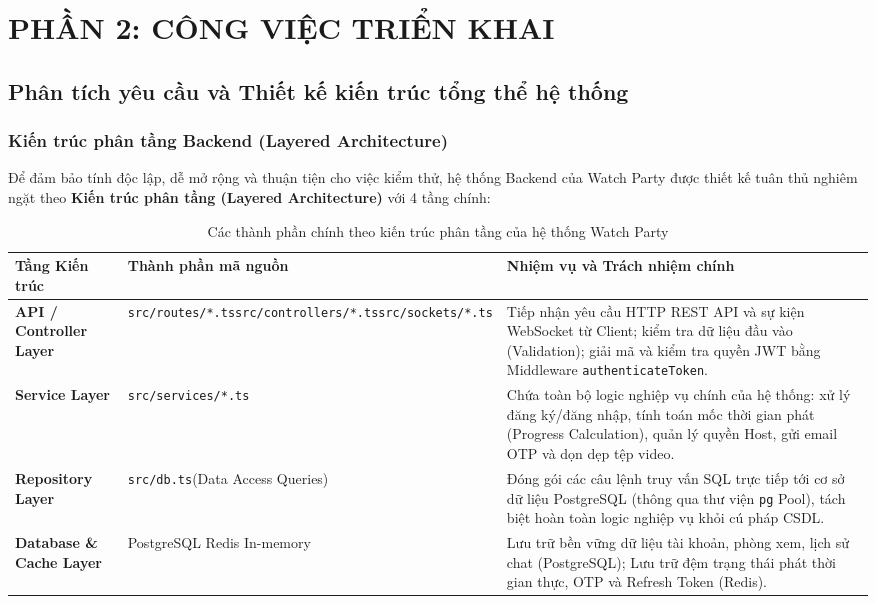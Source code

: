 \documentclass[12pt,a4paper]{extarticle}
\begin{document}
\newpage

\section{PHẦN 2: CÔNG VIỆC TRIỂN KHAI}

\subsection{Phân tích yêu cầu và Thiết kế kiến trúc tổng thể hệ thống}

\subsubsection{Kiến trúc phân tầng Backend (Layered Architecture)}
Để đảm bảo tính độc lập, dễ mở rộng và thuận tiện cho việc kiểm thử, hệ thống Backend của Watch Party được thiết kế tuân thủ nghiêm ngặt theo \textbf{Kiến trúc phân tầng (Layered Architecture)} với 4 tầng chính:

\begin{table}[H]
\centering
\small
\caption{Các thành phần chính theo kiến trúc phân tầng của hệ thống Watch Party}
\label{tab:arch_layers}
\renewcommand{\arraystretch}{1.3}
\begin{tabular}{|p{3cm}|p{4.5cm}|p{7.5cm}|}
\hline
\textbf{Tầng Kiến trúc} & \textbf{Thành phần mã nguồn} & \textbf{Nhiệm vụ và Trách nhiệm chính} \\ \hline
\textbf{API / Controller Layer} & \texttt{src/routes/*.ts}\newline \texttt{src/controllers/*.ts}\newline \texttt{src/sockets/*.ts} & Tiếp nhận yêu cầu HTTP REST API và sự kiện WebSocket từ Client; kiểm tra dữ liệu đầu vào (Validation); giải mã và kiểm tra quyền JWT bằng Middleware \texttt{authenticateToken}. \\ \hline
\textbf{Service Layer} & \texttt{src/services/*.ts} & Chứa toàn bộ logic nghiệp vụ chính của hệ thống: xử lý đăng ký/đăng nhập, tính toán mốc thời gian phát (Progress Calculation), quản lý quyền Host, gửi email OTP và dọn dẹp tệp video. \\ \hline
\textbf{Repository Layer} & \texttt{src/db.ts}\newline (Data Access Queries) & Đóng gói các câu lệnh truy vấn SQL trực tiếp tới cơ sở dữ liệu PostgreSQL (thông qua thư viện \texttt{pg} Pool), tách biệt hoàn toàn logic nghiệp vụ khỏi cú pháp CSDL. \\ \hline
\textbf{Database \& Cache Layer} & PostgreSQL \newline Redis In-memory & Lưu trữ bền vững dữ liệu tài khoản, phòng xem, lịch sử chat (PostgreSQL); Lưu trữ đệm trạng thái phát thời gian thực, OTP và Refresh Token (Redis). \\ \hline
\end{tabular}
\end{table}
\end{document}
